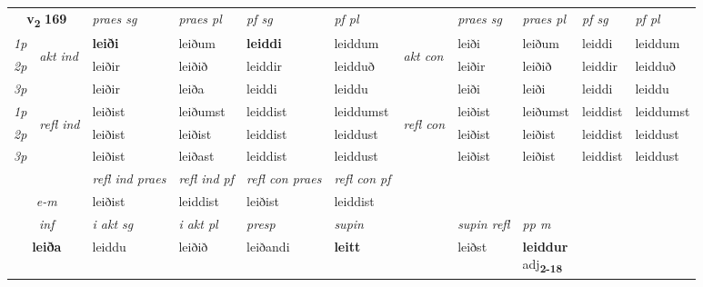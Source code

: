 \noindent
\begin{tabular}{lllllllllll} \toprule
\multicolumn{2}{c}{\textbf{v{\textsubscript{2}}} \Large{\textbf{169}}}  &  \textit{praes sg}  & \textit{praes pl}  &\textit{ pf sg} & \textit{pf pl} &  &  \textit{praes sg}  & \textit{praes pl}  & \textit{pf sg} & \textit{pf pl } \\*
	\cmidrule{3-6} \cmidrule{8-11}
 {\textit{1p}} & \multirow{3}{*}{\begin{turn}{90}\textit{akt ind}\end{turn}} & \textbf{leiði} & leiðum & \textbf{leiddi} & leiddum & \multirow{3}{*}{\begin{turn}{90}\textit{akt con}\end{turn}} &leiði & leiðum & leiddi & leiddum\\*
 {\textit{2p}} &  &  leiðir  & leiðið & leiddir & leidduð & & leiðir & leiðið & leiddir & leidduð \\*
{\textit{3p}} &  & leiðir & leiða & leiddi & leiddu & & leiði & leiði& leiddi & leiddu \\*
\cmidrule{3-6} \cmidrule{8-11}
 {\textit{1p}} & \multirow{3}{*}{\begin{turn}{90}\textit{refl ind}\end{turn}}  & leiðist & leiðumst & leiddist & leiddumst & \multirow{3}{*}{\begin{turn}{90}\textit{refl con}\end{turn}}  &leiðist & leiðumst & leiddist & leiddumst \\*
 {\textit{2p}} &  & leiðist & leiðist & leiddist & leiddust & &leiðist & leiðist & leiddist & leiddust \\*
 {\textit{3p}}  & & leiðist & leiðast & leiddist & leiddust & & leiðist & leiðist& leiddist & leiddust \\*
\cmidrule{3-6} \cmidrule{8-11}

 & & \textit{refl ind praes} & \textit{refl ind pf} & \textit{refl con praes} & \textit{refl con pf} \\*
 \multicolumn{2}{c}{ \textit{e-m} }& leiðist & leiddist & leiðist & leiddist \\*

\cmidrule{3-9}
   \multicolumn{2}{c}{\textit{inf}}  & \textit{i akt sg} & \textit{i akt pl}   & \textit{presp} & \textit{supin} && \textit{supin refl} & \textit{pp m} \\*
  \multicolumn{2}{c}{\textbf{leiða}} & leiddu  & leiðið   & leiðandi &  \textbf{leitt} && leiðst & \specialcell{\textbf{leiddur} \\ adj\textbf{\textsubscript{2-18}}} \\*
\end{tabular}

